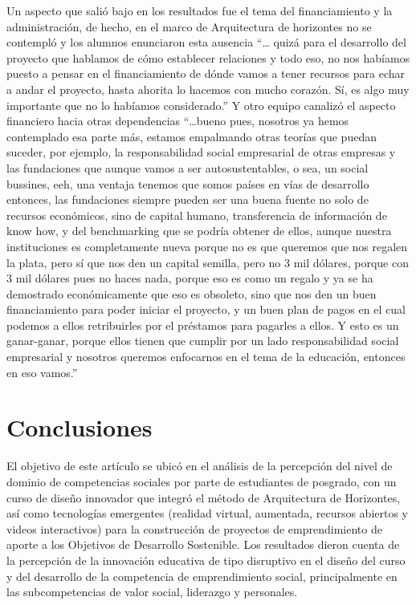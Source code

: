 \documentclass[spanish]{textolivre}
\begin{document}
Un aspecto que salió bajo en los resultados fue el tema del financiamiento y la administración, de hecho, en el marco de Arquitectura de horizontes no se contempló y los alumnos enunciaron esta ausencia “… quizá para el desarrollo del proyecto que hablamos de cómo establecer relaciones y todo eso, no nos habíamos puesto a pensar en el financiamiento de dónde vamos a tener recursos para echar a andar el proyecto, hasta ahorita lo hacemos con mucho corazón. Sí, es algo muy importante que no lo habíamos considerado.” Y otro equipo canalizó el aspecto financiero hacia otras dependencias “…bueno pues, nosotros ya hemos contemplado esa parte más, estamos empalmando otras teorías que puedan suceder, por ejemplo, la responsabilidad social empresarial de otras empresas y las fundaciones que aunque vamos a ser autosustentables, o sea, un social bussines, eeh, una ventaja tenemos que somos países en vías de desarrollo entonces, las fundaciones siempre pueden ser una buena fuente no solo de recursos económicos, sino de capital humano, transferencia de información de know how, y del benchmarking que se podría obtener de ellos, aunque nuestra instituciones es completamente nueva porque no es que queremos que nos regalen la plata, pero sí que nos den un capital semilla, pero no 3 mil dólares, porque con 3 mil dólares pues no haces nada, porque eso es como un regalo y ya se ha demostrado económicamente que eso es obsoleto, sino que nos den un buen financiamiento para poder iniciar el proyecto, y un buen plan de pagos en el cual podemos a ellos retribuirles por el préstamos para pagarles a ellos. Y esto es un ganar-ganar, porque ellos tienen que cumplir por un lado responsabilidad social empresarial y nosotros queremos enfocarnos en el tema de la educación, entonces en eso vamos.”

\section{Conclusiones}
El objetivo de este artículo se ubicó en el análisis de la percepción del nivel de dominio de competencias sociales por parte de estudiantes de posgrado, con un curso de diseño innovador que integró el método de Arquitectura de Horizontes, así como tecnologías emergentes (realidad virtual, aumentada, recursos abiertos y videos interactivos) para la construcción de proyectos de emprendimiento de aporte a los Objetivos de Desarrollo Sostenible. Los resultados dieron cuenta de la percepción de la innovación educativa de tipo disruptivo en el diseño del curso y del desarrollo de la competencia de emprendimiento social, principalmente en las subcompetencias de valor social, liderazgo y personales.
\end{document}
